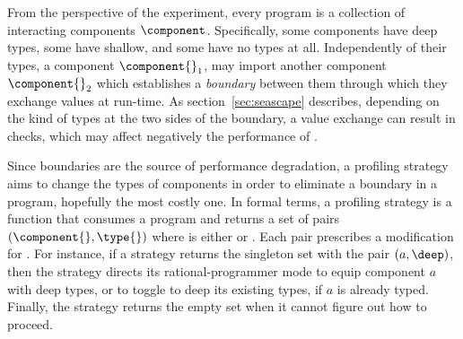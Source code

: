 From the perspective of the experiment, every program \program{} is a
collection of interacting components $\component$. Specifically, some
components have deep types, some  have shallow, and some  have no types at
all. Independently of their types, a component $\component{}_1$, may import
another component $\component{}_2$  which establishes a
\emph{boundary} between them through which they exchange values at
run-time. As section~\ref{sec:seascape} describes, depending on the kind of types at
the two sides of the boundary, a value exchange can result in checks,
which may affect negatively the performance of \program{}. 

 Since boundaries are the source of performance degradation, a profiling
 strategy aims to change the types of components in order to eliminate a
 boundary in a program, hopefully the most costly one. In formal terms, a
 profiling strategy is a function that consumes a program \program{} and
 returns a set of pairs $(\component{}, \type{})$ where \type{} is either
 \deep{} or \shallow{}. Each pair
 prescribes a modification for \program{}. For instance, if a strategy
 returns the singleton set with the pair $(a, \deep)$, then the strategy
 directs its rational-programmer mode to equip component $a$ with deep
 types, or to toggle to deep its existing types, if $a$ is already typed.
 Finally, the strategy returns the empty
 set when it cannot figure out how to proceed.


\def\with{with {\em total\/} in place of {\em self\/}}

